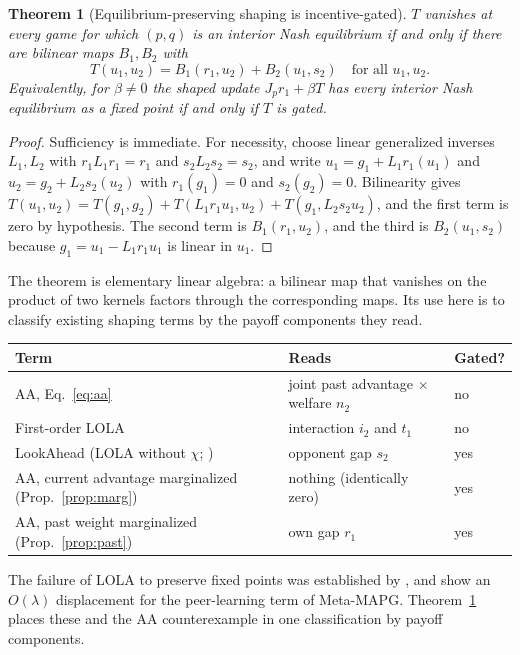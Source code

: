 \documentclass[11pt]{article}
\newtheorem{theorem}{Theorem}
\theoremstyle{remark}
\begin{document}
\begin{theorem}[Equilibrium-preserving shaping is incentive-gated]\label{thm:gated}
$T$ vanishes at every game for which $(p,q)$ is an interior Nash equilibrium if and only if there are bilinear maps $B_1,B_2$ with
\[
T(u_1,u_2)=B_1(r_1,u_2)+B_2(u_1,s_2)\quad\text{for all }u_1,u_2 .
\]
Equivalently, for $\beta\neq0$ the shaped update $J_pr_1+\beta T$ has every interior Nash equilibrium as a fixed point if and only if $T$ is gated.
\end{theorem}
\begin{proof}
Sufficiency is immediate. For necessity, choose linear generalized inverses $L_1,L_2$ with $r_1L_1r_1=r_1$ and $s_2L_2s_2=s_2$, and write $u_1=g_1+L_1r_1(u_1)$ and $u_2=g_2+L_2s_2(u_2)$ with $r_1(g_1)=0$ and $s_2(g_2)=0$. Bilinearity gives $T(u_1,u_2)=T(g_1,g_2)+T(L_1r_1u_1,u_2)+T(g_1,L_2s_2u_2)$, and the first term is zero by hypothesis. The second term is $B_1(r_1,u_2)$, and the third is $B_2(u_1,s_2)$ because $g_1=u_1-L_1r_1u_1$ is linear in $u_1$.
\end{proof}

The theorem is elementary linear algebra: a bilinear map that vanishes on the product of two kernels factors through the corresponding maps. Its use here is to classify existing shaping terms by the payoff components they read.

\begin{center}
\small
\begin{tabular}{lll}\toprule
Term & Reads & Gated?\\\midrule
AA, Eq.~\eqref{eq:aa} & joint past advantage $\times$ welfare $n_2$ & no\\
First-order LOLA & interaction $i_2$ and $t_1$ & no\\
LookAhead (LOLA without $\chi$; \citealp{letcher2019sos}) & opponent gap $s_2$ & yes\\
AA, current advantage marginalized (Prop.~\ref{prop:marg}) & nothing (identically zero) & yes\\
AA, past weight marginalized (Prop.~\ref{prop:past}) & own gap $r_1$ & yes\\\bottomrule
\end{tabular}
\end{center}

The failure of LOLA to preserve fixed points was established by \citet{letcher2019sos}, and \citet{shcherbinin2026basin} show an $O(\lambda)$ displacement for the peer-learning term of Meta-MAPG. Theorem~\ref{thm:gated} places these and the AA counterexample in one classification by payoff components.
\end{document}
